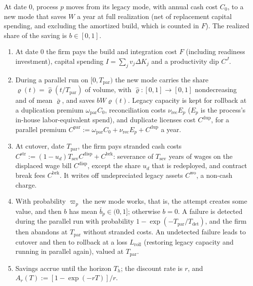 \begin{assumption}[Transition]\label{ass:tasks-transition}
At date 0, process $p$ moves from its legacy mode, with annual cash cost $C_0$, to a new mode that saves $W$ a year at full realization (net of replacement capital spending, and excluding the amortized build, which is counted in $F$). The realized share of the saving is $b\in[0,1]$.
\begin{enumerate}
\item[(i)] At date 0 the firm pays the build and integration cost $F$ (including readiness investment), capital spending $I=\sum_jv_j\Delta K_j$ and a productivity dip $C^J$.
\item[(ii)] During a parallel run on $[0,T_{\mathrm{par}})$ the new mode carries the share $\varrho(t)=\hat\varrho(t/T_{\mathrm{par}})$ of volume, with $\hat\varrho:[0,1]\to[0,1]$ nondecreasing and of mean $\bar\varrho$, and saves $bW\varrho(t)$. Legacy capacity is kept for rollback at a duplication premium $\omega_{\mathrm{par}}C_0$, reconciliation costs $\nu_{\mathrm{rec}}E_p$ ($E_p$ is the process's in-house labor-equivalent spend), and duplicate licenses cost $C^{\mathrm{dup}}$, for a parallel premium $C^{\mathrm{par}}:=\omega_{\mathrm{par}}C_0+\nu_{\mathrm{rec}}E_p+C^{\mathrm{dup}}$ a year.
\item[(iii)] At cutover, date $T_{\mathrm{par}}$, the firm pays stranded cash costs $C^{\mathrm{str}}:=(1-u_d)T_{\mathrm{sev}}C^{\mathrm{disp}}+C^{\mathrm{brk}}$: severance of $T_{\mathrm{sev}}$ years of wages on the displaced wage bill $C^{\mathrm{disp}}$, except the share $u_d$ that is redeployed, and contract break fees $C^{\mathrm{brk}}$. It writes off undepreciated legacy assets $C^{\mathrm{wo}}$, a non-cash charge.
\item[(iv)] With probability $\varpi_p$ the new mode works, that is, the attempt creates some value, and then $b$ has mean $\bar b_p\in(0,1]$; otherwise $b=0$. A failure is detected during the parallel run with probability $1-\exp(-T_{\mathrm{par}}/T_{\mathrm{det}})$, and the firm then abandons at $T_{\mathrm{par}}$ without stranded costs. An undetected failure leads to cutover and then to rollback at a loss $L_{\mathrm{roll}}$ (restoring legacy capacity and running in parallel again), valued at $T_{\mathrm{par}}$.
\item[(v)] Savings accrue until the horizon $T_h$; the discount rate is $r$, and $A_r(T):=[1-\exp(-rT)]/r$.
\end{enumerate}
\end{assumption}

